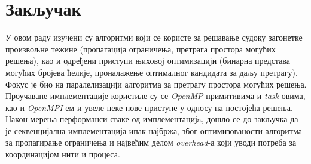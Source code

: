 \section{Закључак}
У овом раду изучени су алгоритми који се користе за решавање судоку загонетке произвољне тежине (пропагација ограничења, претрага простора могућих решења), као и одређени приступи њиховој оптимизацији (бинарна представа могућих бројева ћелије, проналажење оптималног кандидата за даљу претрагу). Фокус је био на паралелизацији алгоритма за претрагу простора могућих решења. Проучаване имплементације користиле су се \textit{OpenMP} примитивима и \textit{task}-овима, као и \textit{OpenMPI}-ем и увеле неке нове приступе у односу на постојећа решења. Након мерења перформанси сваке од имплементацијa, дошло се до закључка да је секвенцијална имплементација ипак најбржа, због оптимизованости алгоритма за пропагирање ограничења и највећим делом \textit{overhead}-а који уводи потреба за координацијом нити и процеса.